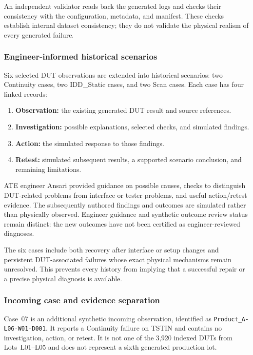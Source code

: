 \documentclass[conference]{IEEEtran}
\begin{document}
An independent validator reads back the generated logs and
checks their consistency with the configuration, metadata,
and manifest. These checks establish internal dataset
consistency; they do not validate the physical realism of
every generated failure.

\subsubsection{Engineer-informed historical scenarios}

Six selected DUT observations are extended into historical
scenarios: two Continuity cases, two IDD\_Static cases,
and two Scan cases. Each case has four linked records:

\begin{enumerate}
\item \textbf{Observation:}
the existing generated DUT result and source references.

\item \textbf{Investigation:}
possible explanations, selected checks, and simulated findings.

\item \textbf{Action:}
the simulated response to those findings.

\item \textbf{Retest:}
simulated subsequent results, a supported scenario conclusion,
and remaining limitations.
\end{enumerate}

ATE engineer Ansari provided guidance on possible causes,
checks to distinguish DUT-related problems from interface
or tester problems, and useful action/retest evidence.
The subsequently authored findings and outcomes are simulated
rather than physically observed. Engineer guidance and synthetic
outcome review status remain distinct: the new outcomes have
not been certified as engineer-reviewed diagnoses.

The six cases include both recovery after interface or setup
changes and persistent DUT-associated failures whose exact
physical mechanisms remain unresolved. This prevents every
history from implying that a successful repair or a precise
physical diagnosis is available.

\subsubsection{Incoming case and evidence separation}

Case~07 is an additional synthetic incoming observation,
identified as \texttt{Product\_A-L06-W01-D001}.
It reports a Continuity failure on TSTIN and contains no
investigation, action, or retest. It is not one of the
3,920 indexed DUTs from Lots~L01--L05 and does not represent
a sixth generated production lot.
\end{document}
